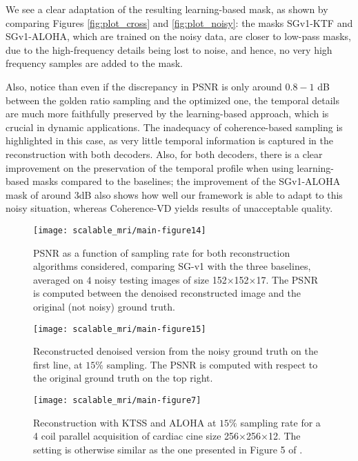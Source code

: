 We see a clear adaptation of the resulting learning-based mask, as shown by comparing Figures \ref{fig:plot_cross} and \ref{fig:plot_noisy}: the masks SGv1-KTF and SGv1-ALOHA, which are trained on the noisy data, are closer to low-pass masks, due to the high-frequency details being lost to noise, and hence, no very high frequency samples are added to the mask. 

 Also, notice than even if the discrepancy in PSNR is only around $0.8-1$ dB between the golden ratio sampling and the optimized one, the temporal details are much more faithfully preserved by the learning-based approach, which is crucial in dynamic applications. The inadequacy of coherence-based sampling is highlighted in this case, as very little temporal information is captured in the reconstruction with both decoders. Also, for both decoders, there is a clear improvement on the preservation of the temporal profile when using learning-based masks compared to the baselines; the improvement of the SGv1-ALOHA mask of around $3$dB also shows how well our framework is able to adapt to this noisy situation, whereas Coherence-VD yields results of unacceptable quality.

\begin{figure}[!t]
    \centering
    \texttt{[image: scalable\_mri/main-figure14]}
    \caption{PSNR as a function of sampling rate for both reconstruction algorithms considered, comparing SG-v1 with the three baselines, averaged on $4$ noisy testing images of size 152$\times$152$\times$17. The PSNR is computed between the denoised reconstructed image and the original (not noisy) ground truth.}\label{fig:psnr_noisy}
\end{figure}


\begin{figure}[!t]
    \begin{minipage}[t]{.48\linewidth}
        \centering
        \vspace{1.4cm}
        \texttt{[image: scalable\_mri/main-figure15]}
        \caption{Reconstructed denoised version from the noisy ground truth on the first line, at $15\%$ sampling. The PSNR is computed with respect to the original ground truth on the top right.}\label{fig:plot_noisy}
    \end{minipage}
    \begin{minipage}[t]{.48\linewidth}
        \centering
        \vspace{1cm}
        \texttt{[image: scalable\_mri/main-figure7]}
        \caption{Reconstruction with KTSS \protect\citep{otazo2010combination} and ALOHA \citep{jin2016general} at $15\%$  sampling rate for a 4 coil parallel acquisition of cardiac cine size 256$\times$256$\times$12. The setting is otherwise similar as the one presented in Figure 5 of \citep{sanchez2019scalable}.}\label{fig:multi}
    \end{minipage}

    \vspace{1.3cm}
    \end{figure}


